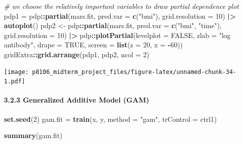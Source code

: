 \documentclass[
]{article}
\newenvironment{Shaded}{\begin{snugshade}}{\end{snugshade}}
\newcommand{\AttributeTok}[1]{\textcolor[rgb]{0.13,0.29,0.53}{#1}}
\newcommand{\CommentTok}[1]{\textcolor[rgb]{0.56,0.35,0.01}{\textit{#1}}}
\newcommand{\ConstantTok}[1]{\textcolor[rgb]{0.56,0.35,0.01}{#1}}
\newcommand{\DecValTok}[1]{\textcolor[rgb]{0.00,0.00,0.81}{#1}}
\newcommand{\FunctionTok}[1]{\textcolor[rgb]{0.13,0.29,0.53}{\textbf{#1}}}
\newcommand{\NormalTok}[1]{#1}
\newcommand{\OtherTok}[1]{\textcolor[rgb]{0.56,0.35,0.01}{#1}}
\newcommand{\SpecialCharTok}[1]{\textcolor[rgb]{0.81,0.36,0.00}{\textbf{#1}}}
\newcommand{\StringTok}[1]{\textcolor[rgb]{0.31,0.60,0.02}{#1}}
\begin{document}
\begin{Shaded}
\begin{Highlighting}[]
\CommentTok{\# we choose the relatively important variables to draw partial dependence plot}
\NormalTok{pdp1 }\OtherTok{=}\NormalTok{ pdp}\SpecialCharTok{::}\FunctionTok{partial}\NormalTok{(mars.fit, }\AttributeTok{pred.var =} \FunctionTok{c}\NormalTok{(}\StringTok{"bmi"}\NormalTok{), }\AttributeTok{grid.resolution =} \DecValTok{10}\NormalTok{) }\SpecialCharTok{|\textgreater{}} \FunctionTok{autoplot}\NormalTok{()}
\NormalTok{pdp2 }\OtherTok{\textless{}{-}}\NormalTok{ pdp}\SpecialCharTok{::}\FunctionTok{partial}\NormalTok{(mars.fit, }\AttributeTok{pred.var =} \FunctionTok{c}\NormalTok{(}\StringTok{"bmi"}\NormalTok{, }\StringTok{"time"}\NormalTok{), }\AttributeTok{grid.resolution =} \DecValTok{10}\NormalTok{) }\SpecialCharTok{|\textgreater{}}
\NormalTok{pdp}\SpecialCharTok{::}\FunctionTok{plotPartial}\NormalTok{(}\AttributeTok{levelplot =} \ConstantTok{FALSE}\NormalTok{, }\AttributeTok{zlab =} \StringTok{"log antibody"}\NormalTok{, }\AttributeTok{drape =} \ConstantTok{TRUE}\NormalTok{,}
\AttributeTok{screen =} \FunctionTok{list}\NormalTok{(}\AttributeTok{z =} \DecValTok{20}\NormalTok{, }\AttributeTok{x =} \SpecialCharTok{{-}}\DecValTok{60}\NormalTok{))}
\NormalTok{gridExtra}\SpecialCharTok{::}\FunctionTok{grid.arrange}\NormalTok{(pdp1, pdp2, }\AttributeTok{ncol =} \DecValTok{2}\NormalTok{)}
\end{Highlighting}
\end{Shaded}

\texttt{[image: p8106\_midterm\_project\_files/figure-latex/unnamed-chunk-34-1.pdf]}

\paragraph{3.2.3 Generalized Additive Model
(GAM)}\label{generalized-additive-model-gam}

\begin{Shaded}
\begin{Highlighting}[]
\FunctionTok{set.seed}\NormalTok{(}\DecValTok{2}\NormalTok{)}
\NormalTok{gam.fit }\OtherTok{=} \FunctionTok{train}\NormalTok{(x, y, }\AttributeTok{method =} \StringTok{"gam"}\NormalTok{, }\AttributeTok{trControl =}\NormalTok{ ctrl1)}

\FunctionTok{summary}\NormalTok{(gam.fit)}
\end{Highlighting}
\end{Shaded}
\end{document}
